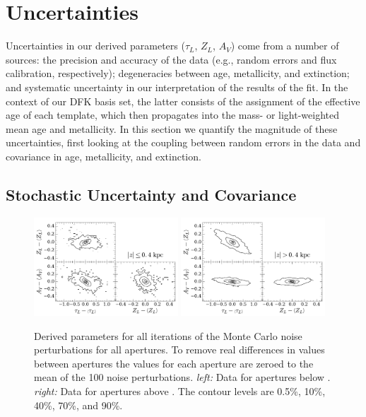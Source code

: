 \section{Uncertainties}
\label{891_2:sec:uncertainty}

Uncertainties in our derived parameters ($\tau_L$, $Z_L$, $A_V$) come
from a number of sources: the precision and accuracy of the data
(e.g., random errors and flux calibration, respectively); degeneracies
between age, metallicity, and extinction; and systematic uncertainty
in our interpretation of the results of the fit. In the context of our
DFK basis set, the latter consists of the assignment of the effective
age of each template, which then propagates into the mass- or
light-weighted mean age and metallicity.  In this section we quantify
the magnitude of these uncertainties, first looking at the coupling
between random errors in the data and covariance in age, metallicity,
and extinction.
 

\subsection{Stochastic Uncertainty and Covariance}
\label{891_2:sec:fit_err}

\begin{figure}
  \centering
  \includegraphics[width=0.48\textwidth]{891_2/figs/MC_covarcont_below.pdf}
  \includegraphics[width=0.48\textwidth]{891_2/figs/MC_covarcont_above.pdf}
  \caption[Covariance between uncertainties in $\tau_L$, $Z_L$, and
    $A_V$]{\fixspacing\label{891_2:fig:MC_covar}Derived parameters for
    all iterations of the Monte Carlo noise perturbations for all
    apertures. To remove real differences in values between apertures
    the values for each aperture are zeroed to the mean of the 100
    noise perturbations. \emph{left:} Data for apertures below
    . \emph{right:} Data for apertures above
    . The contour levels are 0.5\%, 10\%, 40\%, 70\%,
    and 90\%.}
\end{figure}

